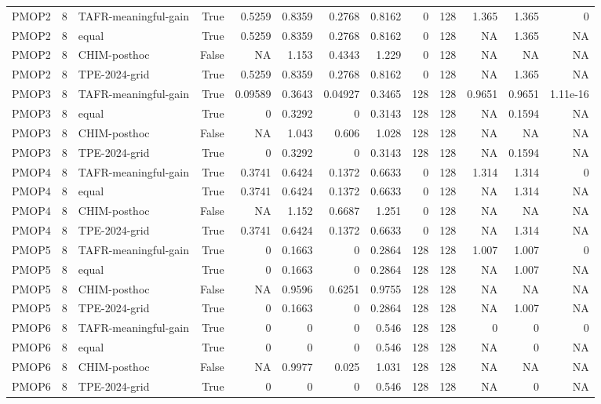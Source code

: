 \begin{tabular}{lrlrrrrrrrrrr}
PMOP2 & 8 & TAFR-meaningful-gain & True & 0.5259 & 0.8359 & 0.2768 & 0.8162 & 0 & 128 & 1.365 & 1.365 & 0 \\
PMOP2 & 8 & equal & True & 0.5259 & 0.8359 & 0.2768 & 0.8162 & 0 & 128 & NA & 1.365 & NA \\
PMOP2 & 8 & CHIM-posthoc & False & NA & 1.153 & 0.4343 & 1.229 & 0 & 128 & NA & NA & NA \\
PMOP2 & 8 & TPE-2024-grid & True & 0.5259 & 0.8359 & 0.2768 & 0.8162 & 0 & 128 & NA & 1.365 & NA \\
PMOP3 & 8 & TAFR-meaningful-gain & True & 0.09589 & 0.3643 & 0.04927 & 0.3465 & 128 & 128 & 0.9651 & 0.9651 & 1.11e-16 \\
PMOP3 & 8 & equal & True & 0 & 0.3292 & 0 & 0.3143 & 128 & 128 & NA & 0.1594 & NA \\
PMOP3 & 8 & CHIM-posthoc & False & NA & 1.043 & 0.606 & 1.028 & 128 & 128 & NA & NA & NA \\
PMOP3 & 8 & TPE-2024-grid & True & 0 & 0.3292 & 0 & 0.3143 & 128 & 128 & NA & 0.1594 & NA \\
PMOP4 & 8 & TAFR-meaningful-gain & True & 0.3741 & 0.6424 & 0.1372 & 0.6633 & 0 & 128 & 1.314 & 1.314 & 0 \\
PMOP4 & 8 & equal & True & 0.3741 & 0.6424 & 0.1372 & 0.6633 & 0 & 128 & NA & 1.314 & NA \\
PMOP4 & 8 & CHIM-posthoc & False & NA & 1.152 & 0.6687 & 1.251 & 0 & 128 & NA & NA & NA \\
PMOP4 & 8 & TPE-2024-grid & True & 0.3741 & 0.6424 & 0.1372 & 0.6633 & 0 & 128 & NA & 1.314 & NA \\
PMOP5 & 8 & TAFR-meaningful-gain & True & 0 & 0.1663 & 0 & 0.2864 & 128 & 128 & 1.007 & 1.007 & 0 \\
PMOP5 & 8 & equal & True & 0 & 0.1663 & 0 & 0.2864 & 128 & 128 & NA & 1.007 & NA \\
PMOP5 & 8 & CHIM-posthoc & False & NA & 0.9596 & 0.6251 & 0.9755 & 128 & 128 & NA & NA & NA \\
PMOP5 & 8 & TPE-2024-grid & True & 0 & 0.1663 & 0 & 0.2864 & 128 & 128 & NA & 1.007 & NA \\
PMOP6 & 8 & TAFR-meaningful-gain & True & 0 & 0 & 0 & 0.546 & 128 & 128 & 0 & 0 & 0 \\
PMOP6 & 8 & equal & True & 0 & 0 & 0 & 0.546 & 128 & 128 & NA & 0 & NA \\
PMOP6 & 8 & CHIM-posthoc & False & NA & 0.9977 & 0.025 & 1.031 & 128 & 128 & NA & NA & NA \\
PMOP6 & 8 & TPE-2024-grid & True & 0 & 0 & 0 & 0.546 & 128 & 128 & NA & 0 & NA \\

\end{tabular}
